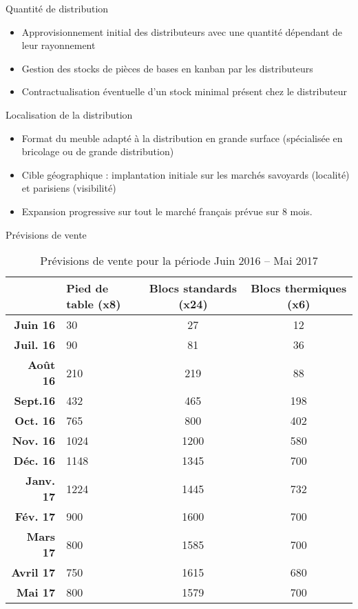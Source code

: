 \begin{frame}{Quantité de distribution}
\begin{itemize}
\item<1-> Approvisionnement initial des distributeurs avec une quantité dépendant de leur rayonnement
\item<2-> Gestion des stocks de pièces de bases en kanban par les distributeurs
\item<3-> Contractualisation éventuelle d'un stock minimal présent chez le distributeur
\end{itemize}
\end{frame}

\begin{frame}{Localisation de la distribution}
	\begin{itemize}
		\item<1-> Format du meuble adapté à la distribution en grande surface (spécialisée en bricolage ou de grande distribution)
		\item<2-> Cible géographique : implantation initiale sur les marchés savoyards (localité) et parisiens (visibilité)
		\item<3-> Expansion progressive sur tout le marché français prévue sur 8 mois.
	\end{itemize}
\end{frame}

\begin{frame}{Prévisions de vente}
	\begin{table}
	\centering
	\begin{tabular}{>{\bfseries}r>{}m{}cc}
		\toprule
		& \textbf{Pied de table (x8)} & \textbf{Blocs standards (x24)} &
		\textbf{Blocs
		thermiques (x6)} \\
		\midrule
		Juin 16 & 30 & 27 & 12\\
		Juil. 16 & 90 & 81 & 36\\
		Août 16 & 210 & 219 & 88\\
		Sept.16 & 432 & 465 & 198 \\
		Oct. 16 & 765 & 800 & 402\\
		Nov. 16 & 1024 & 1200 & 580 \\
		Déc. 16 & 1148 & 1345 & 700 \\
		Janv. 17 & 1224 & 1445 & 732\\
		Fév. 17 & 900 & 1600 & 700\\
		Mars 17 & 800 & 1585 & 700\\
		Avril 17 & 750 & 1615 & 680\\
		Mai 17 & 800 & 1579 & 700\\
		\bottomrule
	\end{tabular}
	\caption{Prévisions de vente pour la période Juin 2016 -- Mai
	2017\label{prevVente}}
\end{table}
\end{frame}